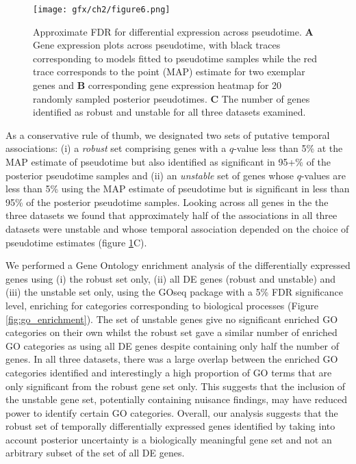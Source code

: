 \begin{figure}
	\centering
	\texttt{[image: gfx/ch2/figure6.png]}
\caption[Approximate FDR for differential expression across pseudotime.]{ Approximate FDR for differential expression across pseudotime.
\textbf{A} Gene expression plots across pseudotime, with black traces corresponding to models fitted to pseudotime samples while the red trace corresponds to the point (MAP) estimate for two exemplar genes and \textbf{B} corresponding gene expression heatmap for 20 randomly sampled posterior pseudotimes.
\textbf{C} The number of genes identified as robust and unstable for all three datasets examined.}
\label{fig:afdr}
\end{figure}

As a conservative rule of thumb, we designated two sets of putative temporal associations: (i) a \emph{robust} set comprising genes with a $q$-value less than 5\% at the MAP estimate of pseudotime but also identified as significant in 95+\% of the posterior pseudotime samples and (ii) an \emph{unstable} set of genes whose $q$-values are less than 5\% using the MAP estimate of pseudotime but is significant in less than 95\% of the posterior pseudotime samples. Looking across all genes in the the three datasets we found that approximately half of the associations in all three datasets were unstable and whose temporal association depended on the choice of pseudotime estimates (figure \ref{fig:afdr}C).

We performed a Gene Ontology enrichment analysis of the differentially expressed genes using (i) the robust set only, (ii) all DE genes (robust and unstable) and (iii) the unstable set only, using the GOseq package \cite{young2010gene} with a 5\% FDR significance level, enriching for categories corresponding to biological processes (Figure \ref{fig:go_enrichment}). The set of unstable genes give no significant enriched GO categories on their own whilst the robust set gave a similar number of enriched GO categories as using all DE genes despite containing only half the number of genes. In all three datasets, there was a large overlap between the enriched GO categories identified and interestingly a high proportion of GO terms that are only significant from the robust gene set only. This suggests that the inclusion of the unstable gene set, potentially containing nuisance findings, may have reduced power to identify certain GO categories. Overall, our analysis suggests that the robust set of temporally differentially expressed genes identified by taking into account posterior uncertainty is a biologically meaningful gene set and not an arbitrary subset of the set of all DE genes.


